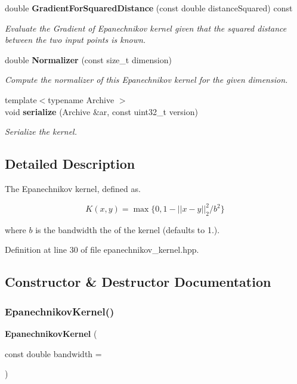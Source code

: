 \begin{DoxyCompactItemize}
double \textbf{ Gradient\+For\+Squared\+Distance} (const double distance\+Squared) const
\begin{DoxyCompactList}\small\item\em Evaluate the Gradient of Epanechnikov kernel given that the squared distance between the two input points is known. \end{DoxyCompactList}\item 
double \textbf{ Normalizer} (const size\+\_\+t dimension)
\begin{DoxyCompactList}\small\item\em Compute the normalizer of this Epanechnikov kernel for the given dimension. \end{DoxyCompactList}\item 
{\footnotesize template$<$typename Archive $>$ }\\void \textbf{ serialize} (Archive \&ar, const uint32\+\_\+t version)
\begin{DoxyCompactList}\small\item\em Serialize the kernel. \end{DoxyCompactList}\end{DoxyCompactItemize}


\subsection{Detailed Description}
The Epanechnikov kernel, defined as. 

\[ K(x, y) = \max \{0, 1 - || x - y ||^2_2 / b^2 \} \]

where $ b $ is the bandwidth the of the kernel (defaults to 1.). 

Definition at line 30 of file epanechnikov\+\_\+kernel.\+hpp.



\subsection{Constructor \& Destructor Documentation}
\mbox{\label{classmlpack_1_1kernel_1_1EpanechnikovKernel_ad3880022e464ae367ed9b7342f0cdf37}} 
\subsubsection{Epanechnikov\+Kernel()}
{\footnotesize\ttfamily \textbf{ Epanechnikov\+Kernel} (\begin{DoxyParamCaption}\item[{const double}]{bandwidth = {} }\end{DoxyParamCaption})\hspace{0.3cm}{\ttfamily [inline]}}



